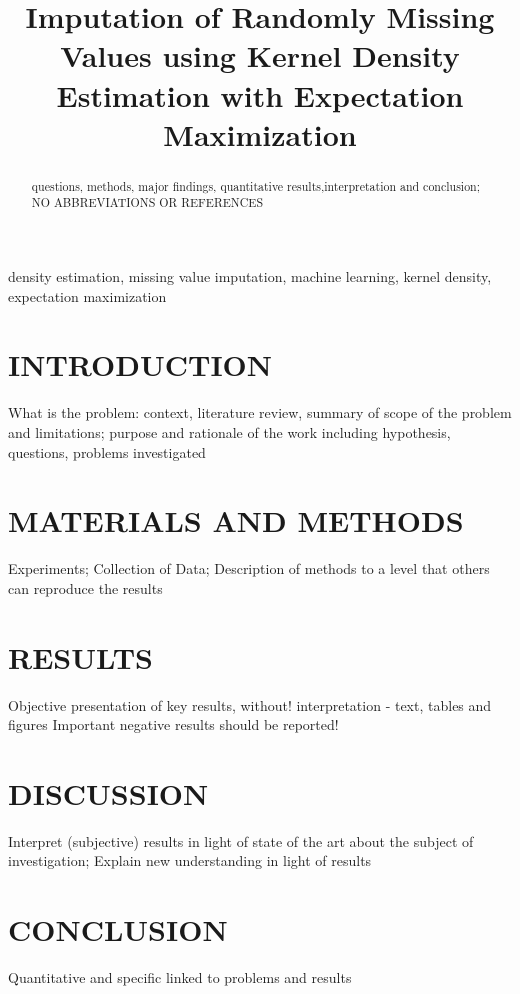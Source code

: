 \documentclass{article}
\title{Imputation of Randomly Missing Values using Kernel Density Estimation with Expectation Maximization}
\begin{document}
%

\maketitle
%
\begin{abstract}
questions, methods, major findings, quantitative results,interpretation and conclusion;
NO ABBREVIATIONS OR REFERENCES
\end{abstract}
%
\begin{keywords}
density estimation, missing value imputation, machine learning, kernel density, expectation maximization
\end{keywords}
%
\section{INTRODUCTION}
\label{sec:intro}

What is the problem: context, literature review, summary of scope of the problem and limitations;
purpose and rationale of the work including hypothesis, questions, problems investigated

\section{MATERIALS AND METHODS}
\label{sec:MatMet}

Experiments; Collection of Data; Description of methods to a level that others can reproduce the results

\section{RESULTS}
\label{sec:results}

Objective presentation of key results, without! interpretation - text, tables and figures
Important negative results should be reported!

\section{DISCUSSION}
\label{sec:discussion}
Interpret (subjective) results in light of state of the art about the subject of investigation;
Explain new understanding in light of results

\section{CONCLUSION}
\label{sec:conclusion}

Quantitative and specific linked to problems and results
\end{document}
